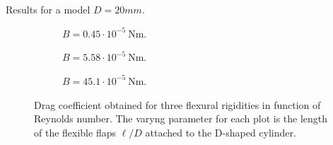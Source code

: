 \documentclass[10pt,fleqn,a4paper,twoside]{article}
\title{}
\author{}
\begin{document}
	
	\maketitle
	
	\begin{abstract}
		
	\end{abstract}
	
	\section{}
Results for a model $D = 20mm$.
	\begin{figure}
		
		\centering
		
		\begin{subfigure}[t]{.49\columnwidth} \begin{adjustbox}{varwidth=\textwidth,fbox,center}	
					\centering				
				\caption{$B=0.45\cdot10^{-5}\SI{}{\newton\meter}$.}\label{fig:B004}	\end{adjustbox}
		\end{subfigure}
		\begin{subfigure}[t]{.49\columnwidth}	\begin{adjustbox}{varwidth=\textwidth,fbox,center}
				\caption{$B=5.58\cdot10^{-5}\SI{}{\newton\meter}$.}\label{fig:B050}	\end{adjustbox}
		\end{subfigure}
		\vfill
		\begin{subfigure}[t]{.49	\columnwidth}	\begin{adjustbox}{varwidth=\textwidth,fbox,center}
				\caption{$B=45.1\cdot10^{-5}\SI{}{\newton\meter}$.}\label{fig:B454}	\end{adjustbox}
		\end{subfigure}
			\caption{Drag coefficient obtained for three flexural rigidities in function of Reynolds number. The varyng parameter for each plot is the length of the flexible flaps $\ell/D$ attached to the D-shaped cylinder.}\label{fig:cd}
		\end{figure} 
\end{document}

